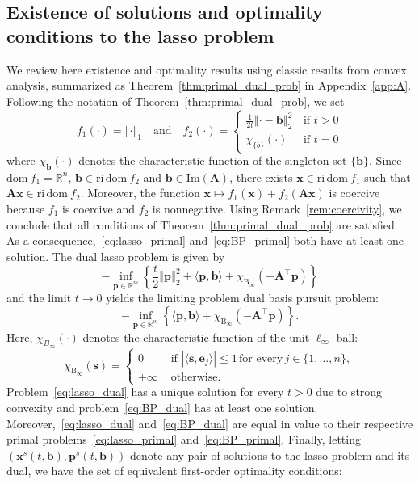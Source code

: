 \documentclass[11pt]{article}
\numberwithin{prop}{section}
\numberwithin{lem}{section}
\numberwithin{rem}{section}
\numberwithin{cor}{section}
\numberwithin{thm}{section}
\numberwithin{defn}{section}
\numberwithin{fact}{section}
\theoremstyle{plain}
\def\bb {\boldsymbol{b}}
\def\be {\boldsymbol{e}}
\def\bp {\boldsymbol{p}}
\def\bs {\boldsymbol{s}}
\def\bx {\boldsymbol{x}}
\def\R {\mathbb{R}}
\newcommand{\normsq}[1]{\left\Vert{#1} \right\Vert_{2}^{2}}
\newcommand{\normone}[1]{\left\Vert{#1} \right\Vert_{1}}
\newcommand{\matr}[1]{\bm{#1}}
\def\dom {\mathrm{dom~}}    %
\def\ri {\mathrm{ri}}      %
\def\Binf {\mathrm{B}_{\infty}}
\def\Rn {\R^n}
\def\Rm {\R^m}
\def\bxsol {\bx^{s}}
\def\bpsol {\bp^{s}}
\newcommand{\image}[1]{\mathrm{Im}({#1})}
\def\Atop {\matr{A}^{\top}}
\begin{document}
\subsection{Existence of solutions and optimality conditions to the lasso problem}\label{subsec:reviewI}
We review here existence and optimality results using classic results from convex analysis, summarized as Theorem~\ref{thm:primal_dual_prob} in Appendix~\ref{app:A}. Following the notation of Theorem~\ref{thm:primal_dual_prob}, we set 
\[
f_{1}(\cdot) = \normone{\cdot} \quad \text{and} \quad f_{2}(\cdot) = \begin{cases}
\frac{1}{2t}\normsq{\cdot-\bb}\, &\text{if } t > 0 \\
\chi_{\{b\}}(\cdot)\, &\text{if } t = 0
\end{cases}
\]
where $\chi_{\bb}(\cdot)$ denotes the characteristic function of the singleton set $\{\bb\}$. Since $\dom f_{1} = \Rn$, $\bb \in \ri \, \dom f_{2}$ and $\bb \in \image{\matr{A}}$, there exists $\bx \in \ri \, \dom f_{1}$ such that $\matr{A}\bx \in \ri \, \dom f_{2}$. Moreover, the function $\bx \mapsto f_{1}(\bx) + f_{2}(\matr{A}\bx)$ is coercive because $f_{1}$ is coercive and $f_{2}$ is nonnegative. Using Remark~\ref{rem:coercivity}, we conclude that all conditions of Theorem~\ref{thm:primal_dual_prob} are satisfied. As a consequence,~\eqref{eq:lasso_primal} and~\eqref{eq:BP_primal} both have at least one solution. The dual lasso problem is given by
\begin{equation}\label{eq:lasso_dual}\tag{dLASSO}
    -\inf_{\bp \in \Rm} \left\{\frac{t}{2}\normsq{\bp} + \langle\bp,\bb\rangle + \chi_{\Binf}(-\Atop\bp)\right\}
\end{equation}
and the limit $t\to 0$ yields the limiting problem dual basis pursuit problem:
\begin{equation}\label{eq:BP_dual}\tag{dBP}
    -\inf_{\bp \in \Rm} \left\{\langle\bp,\bb\rangle + \chi_{\Binf}(-\Atop\bp)\right\}.
\end{equation}
Here, $\chi_{B_{\infty}}(\cdot)$ denotes the characteristic function of the unit $\ell_{\infty}$-ball:
\begin{equation}\label{eq:charfunl1}
\chi_{\Binf}(\bs) = \begin{cases}
0\, &\, \text{if } |\langle \bs,\be_{j}\rangle| \leqslant 1 \,\text{for every}\, j\in\{1,\dots,n\},\\
+\infty\, &\, \text{otherwise}.
\end{cases}
\end{equation}
Problem~\eqref{eq:lasso_dual} has a unique solution for every $t>0$ due to strong convexity and problem~\eqref{eq:BP_dual} has at least one solution. Moreover,~\eqref{eq:lasso_dual} and~\eqref{eq:BP_dual} are equal in value to their respective primal problems~\eqref{eq:lasso_primal} and~\eqref{eq:BP_primal}. Finally, letting $(\bxsol(t,\bb),\bpsol(t,\bb))$ denote any pair of solutions to the lasso problem and its dual, we have the set of equivalent first-order optimality conditions:
\end{document}
